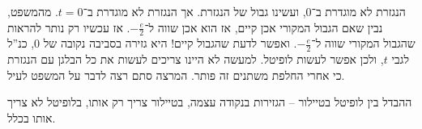 \documentclass[name=רשימות חשבון דיפרנציאלי ואינטגרלי 1א]{../../../tex/classes/megasumPreamble}
\begin{document}
{	הנגזרת לא מוגדרת ב־$0$, ועשינו גבול של הנגזרת. אך הנגזרת לא מוגדרת ב־$t = 0$. מהמשפט, נבין שאם הגבול המקורי אכן קיים, אז הוא אכן שווה ל־$-\frac{e}{2}$. אז עכשיו רק נותר להראות שהגבול המקורי שווה ל־$-\frac{e}{2}$. ואפשר לדעת שהגבול קיים! היא גזירה בסביבה נקובה של $0$, כנ''ל לגבי $t$, ולכן אפשר לעשות לופיטל. למעשה לא היינו צריכים לעשות את כל הבלגן עם הנגזרת כי אחרי החלפת משתנים זה פותר. המרצה סתם רצה לדבר על המשפט לעיל.
	}

	ההבדל בין לופיטל בטיילור – הגזירות בנקודה עצמה, בטיילור צריך רק אותו, בלופיטל לא צריך אותו בכלל.
\end{document}
